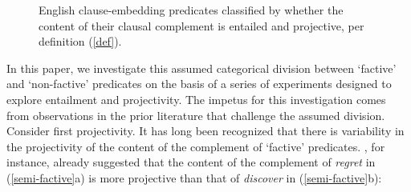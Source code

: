 \documentclass[11pt,fleqn]{article}
\newcommand{\6}{\mbox{$[\hspace*{-.6mm}[$}}
\newcommand{\9}{\mbox{$]\hspace*{-.6mm}]$}}
\begin{document}
\begin{figure}[h]
\center


\caption{English clause-embedding predicates classified by whether the content of their clausal complement is entailed and projective, per definition (\ref{def}).}\label{f-assumption}
\end{figure}

In this paper, we investigate this assumed categorical division between `factive' and `non-factive' predicates on the basis of a series of experiments designed to explore entailment and projectivity. The impetus for this investigation comes from observations in the prior literature that challenge the assumed division. Consider first projectivity. It has long been recognized that there is variability in the projectivity of the content of the complement of `factive' predicates. \citet{karttunen71b}, for instance, already suggested that the content of the complement of {\em regret} in (\ref{semi-factive}a) is more projective than that of {\em discover} in (\ref{semi-factive}b): 
\end{document}
